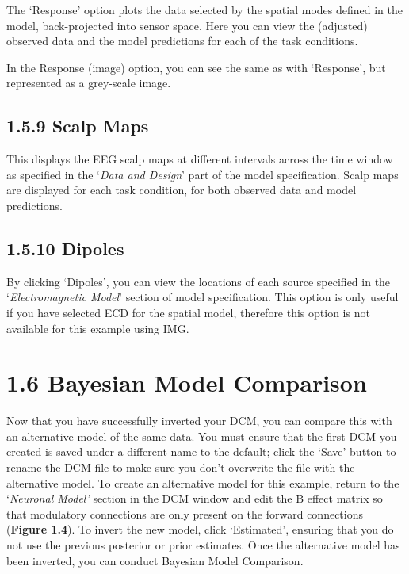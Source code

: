 The `Response' option plots the data selected by the spatial modes
defined in the model, back-projected into sensor space. Here you can
view the (adjusted) observed data and the model predictions for each of
the task conditions.

In the Response (image) option, you can see the same as with `Response',
but represented as a grey-scale image.

\subsection{\texorpdfstring{\textbf{1.5.9 Scalp
Maps}}{1.5.9 Scalp Maps}}\label{scalp-maps}

This displays the EEG scalp maps at different intervals across the time
window as specified in the `\emph{Data and Design}' part of the model
specification. Scalp maps are displayed for each task condition, for
both observed data and model predictions.

\subsection{\texorpdfstring{\textbf{1.5.10
Dipoles}}{1.5.10 Dipoles}}\label{dipoles}

By clicking `Dipoles', you can view the locations of each source
specified in the `\emph{Electromagnetic Model}' section of model
specification. This option is only useful if you have selected ECD for
the spatial model, therefore this option is not available for this
example using IMG.

\section{\texorpdfstring{\textbf{1.6 Bayesian Model
Comparison}}{1.6 Bayesian Model Comparison}}\label{bayesian-model-comparison}

Now that you have successfully inverted your DCM, you can compare this
with an alternative model of the same data. You must ensure that the
first DCM you created is saved under a different name to the default;
click the `Save' button to rename the DCM file to make sure you don't
overwrite the file with the alternative model. To create an alternative
model for this example, return to the `\emph{Neuronal Model'} section in
the DCM window and edit the B effect matrix so that modulatory
connections are only present on the forward connections (\textbf{Figure
1.4}). To invert the new model, click `Estimated', ensuring that you do
not use the previous posterior or prior estimates. Once the alternative
model has been inverted, you can conduct Bayesian Model Comparison.

